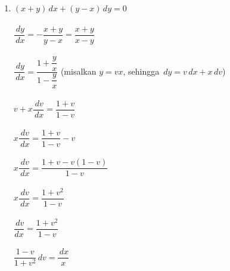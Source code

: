 \begin{enumerate}[1.]

	\item \begin{math}(x + y) \, dx + (y - x) \, dy = 0 \end{math}\\ \\
	         \begin{math} \dfrac{\, dy}{\, dx} = - \dfrac{x + y}{y - x} = \dfrac{x + y}{x - y} \end{math}\\ \\
	         \begin{math} \dfrac{\, dy}{\, dx} = \dfrac{1 + \dfrac{y}{x}}{1 - \dfrac{y}{x}} \end{math} (misalkan \begin{math} y =vx \end{math}, sehingga \begin{math} \, dy = v \,dx + x \, dv \end{math}) \\ \\ 
	         \begin{math} v + x  \dfrac{\, dv}{\, dx} = \dfrac{1 + v}{1 - v} \end{math}\\ \\
	         \begin{math} x \dfrac{\, dv}{\, dx} = \dfrac{1 + v}{1 - v} - v \end{math}\\ \\
 	         \begin{math} x \dfrac{\, dv}{\, dx} = \dfrac{1 + v - v(1 - v)}{1 - v} \end{math}\\ \\
	         \begin{math} x \dfrac{\, dv}{\, dx} = \dfrac{1 + v^{2}}{1 - v} \end{math}\\ \\
	         \begin{math} \dfrac{\, dv}{dx} = \dfrac{1 + v^{2}}{1 - v} \end{math}\\ \\
	         \begin{math} \dfrac{1 - v}{1 + v^{2}} \, dv = \dfrac{\, dx}{x} \end{math}\\ \\

\end{enumerate}
